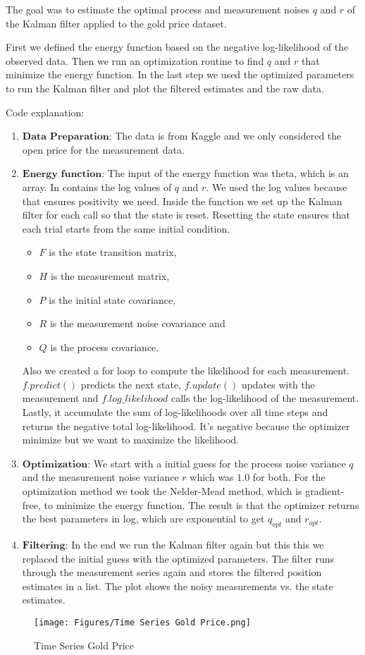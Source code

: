 The goal was to estimate the optimal process and measurement noises $q$ and $r$ of the Kalman filter applied to the gold price dataset. 

First we defined the energy function based on the negative log-likelihood of the observed data. Then we run an optimization routine to find $q$ and $r$ that minimize the energy function. In the last step we used the optimized parameters to run the Kalman filter and plot the filtered estimates and the raw data. 

Code explanation: 
\begin{enumerate}
    \item $\textbf{Data Preparation}$: The data is from Kaggle and we only considered the open price for the measurement data. 
    \item $\textbf{Energy function}$: The input of the energy function was theta, which is an array. In contains the log values of $q$ and $r$. We used the log values because that ensures positivity we need. Inside the function we set up the Kalman filter for each call so that the state is reset. Resetting the state ensures that each trial starts from the same initial condition.
    \begin{itemize}
        \item $F$ is the state transition matrix,
        \item $H$ is the measurement matrix,
        \item $P$ is the initial state covariance,
        \item $R$ is the measurement noise covariance and
        \item $Q$ is the process covariance.
    \end{itemize}
    Also we created a for loop to compute the likelihood for each measurement. $f.predict()$ predicts the next state, $f.update()$ updates with the measurement and $f.log\_likelihood$ calls the log-likelihood of the measurement. Lastly, it accumulate the sum of log-likelihoods over all time steps and returns the negative total log-likelihood. It's negative because the optimizer minimize but we want to maximize the likelihood.
    \item $\textbf{Optimization}$: We start with a initial guess for the process noise variance $q$ and the measurement noise variance $r$ which was $1.0$ for both. For the optimization method we took the Nelder-Mead method, which is gradient-free, to minimize the energy function. The result is that the optimizer returns the best parameters in log, which are exponential to get $q_{opt}$ and $r_{opt}$.
    \item $\textbf{Filtering}$: In the end we run the Kalman filter again but this this we replaced the initial guess with the optimized parameters. The filter runs through the measurement series again and stores the filtered position estimates in a list. The plot shows the noisy measurements vs. the state estimates. 
\end{enumerate}


\begin{figure}
    \centering
    \texttt{[image: Figures/Time Series Gold Price.png]}
    \caption{Time Series Gold Price}
    \label{fig:time_series_goldprice}
\end{figure}